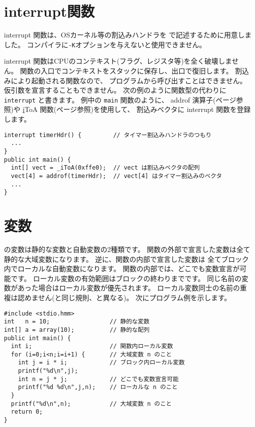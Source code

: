 \section{interrupt関数}
interrupt 関数は、OSカーネル等の割込みハンドラを\cmml
で記述するために用意しました。
コンパイラに\verb/-K/オプションを与えないと使用できません。

interrupt 関数はCPUのコンテキスト(フラグ、レジスタ等)を全く破壊しません。
関数の入口でコンテキストをスタックに保存し、出口で復旧します。
割込みにより起動される関数なので、
プログラムから呼び出すことはできません。
仮引数を宣言することもできません。
次の例のように関数型の代わりに \verb/interrupt/ と書きます。
例中の \verb/main/ 関数のように、
addrof 演算子(\pageref{chap3:addrof}ページ参照)や
\ul iToA 関数(\pageref{chap4:itoa}ページ参照)を使用して、
割込みベクタに interrupt 関数を登録します。

\begin{mylist}
\begin{verbatim}
interrupt timerHdr() {         // タイマー割込みハンドラのつもり
  ...
}
public int main() {
  int[] vect = _iToA(0xffe0);  // vect は割込みベクタの配列
  vect[4] = addrof(timerHdr);  // vect[4] はタイマー割込みのベクタ
  ...
}
\end{verbatim}
\end{mylist}

\section{変数}

\cmml の変数は静的な変数と自動変数の2種類です。
関数の外部で宣言した変数は全て静的な大域変数になります。
逆に、関数の内部で宣言した変数は
全てブロック内でローカルな自動変数になります。
関数の内部では、どこでも変数宣言が可能です。
ローカル変数の有効範囲はブロックの終わりまでです。
同じ名前の変数があった場合はローカル変数が優先されます。
ローカル変数同士の名前の重複は認めません(\javal と同じ規則、\cl と異なる)。
次にプログラム例を示します。

\begin{mylist}
\begin{verbatim}
#include <stdio.hmm>
int   n = 10;                 // 静的な変数
int[] a = array(10);          // 静的な配列
public int main() {
  int i;                      // 関数内ローカル変数
  for (i=0;i<n;i=i+1) {       // 大域変数 n のこと
    int j = i * i;            // ブロック内ローカル変数
    printf("%d\n",j);
    int n = j * j;            // どこでも変数宣言可能
    printf("%d %d\n",j,n);    // ローカルな n のこと
  }                        
  printf("%d\n",n);           // 大域変数 n のこと
  return 0;
}
\end{verbatim}
\end{mylist}

